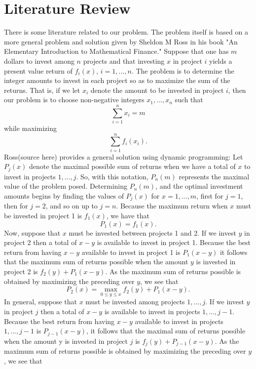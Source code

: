 \documentclass{article}
\begin{document}
\section{Literature Review}
There is some literature related to our problem.  The problem itself is based on a more general problem and solution given by Sheldon M Ross in his book "An Elementary Introduction to Mathematical Finance."
Suppose that one has $m$ dollars to invest among $n$ projects and that investing $x$ in project $i$ yields a present value return of $f_{i}(x)$, $i = 1, ..., n$. The problem is to determine the integer amounts to invest in each project so as to maximize the sum of the returns.  That is, if we let $x_{i}$ denote the amount to be invested in project $i$, then our problem is to choose non-negative integers $x_{1}, ..., x_{n}$ such that $$\sum_{i=1}^{n}x_{i} = m$$ while maximizing $$\sum_{i=1}^{n} f_{i}(x_{i}).$$
\newline
Ross(source here) provides a general solution using dynamic programming:
\linebreak
Let $P_{j}(x)$ denote the maximal possible sum of returns when we have a total of $x$ to invest in projects $1, ..., j$. So, with this notation, $P_{n}(m)$ represents the maximal value of the problem posed. Determining $P_{n}(m)$, and the optimal investment amounts begins by finding the values of $P_{j}(x)$ for $x = 1, ..., m$, first for $j = 1$, then for $j=2$, and so on up to $j=n$.
\linebreak
Because the maximum return when $x$ must be invested in project 1 is $f_{1}(x)$, we have that 
\newline
$$P_{1}(x) = f_{1}(x).$$
\newline
Now, suppose that $x$ must be invested between projects 1 and 2. If we invest $y$ in project 2 then a total of $x-y$ is available to invest in project 1. Because the best return from having $x-y$ available to invest in project 1 is $P_{1}(x-y)$ it follows that the maximum sum of returns possible when the amount $y$ is invested in project 2 is $f_{2}(y) + P_{1}(x-y).$ As the maximum sum of returns possible is obtained by maximizing the preceding over $y$, we see that $$P_{2}(x) = \max_{0\leq y\leq x} f_{2}(y) + P_{1}(x-y).$$
In general, suppose that $x$ must be invested among projects $1, ..., j$. If we invest $y$ in project $j$ then a total of $x-y$ is available to invest in projects $1, ..., j-1$. Because the best return from having $x-y$ available to invest in projects $1, ..., j-1$ is $P_{j-1}(x-y)$, it follows that the maximal sum of returns possible when the amount y is invested in project $j$ is $f_{j}(y) + P_{j-1}(x-y).$ As the maximum sum of returns possible is obtained by maximizing the preceding over $y$, we see that 
\end{document}
